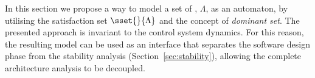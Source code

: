 In this section we propose a way to model a set of \ewhc{}, $\Lambda$, as an automaton, by utilising the satisfaction set $\sset{}{ \Lambda }$ and the concept of \emph{dominant set}.
The presented approach is invariant to the control system dynamics. 
For this reason, the resulting model can be used as an interface that separates the software design phase from the stability analysis (Section~\ref{sec:stability}), allowing the complete architecture analysis to be decoupled.

%
%
